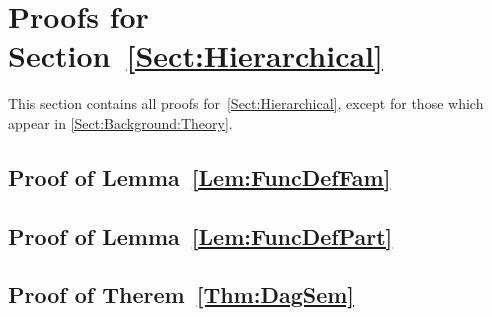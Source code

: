 \section{Proofs for Section~\ref{Sect:Hierarchical}}
%

This section contains all proofs for~\cref{Sect:Hierarchical}, except for those which appear in \cref{Sect:Background:Theory}.

\subsection{Proof of Lemma~\ref{Lem:FuncDefFam}}
%


\subsection{Proof of Lemma~\ref{Lem:FuncDefPart}}
%


\subsection{Proof of Therem~\ref{Thm:DagSem}}
%


